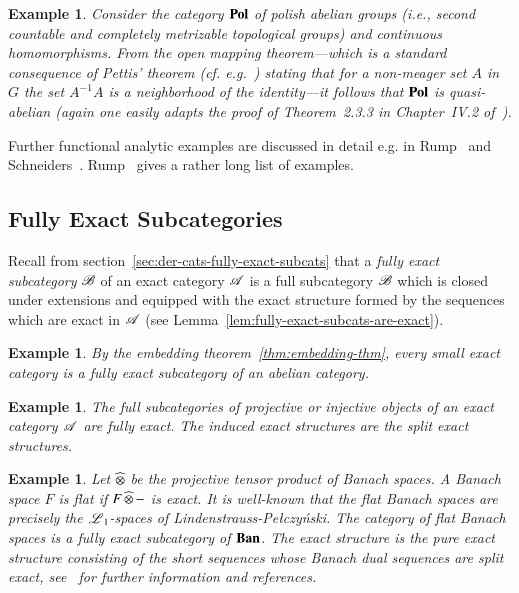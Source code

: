 \documentclass[1p]{elsarticle}
\theoremstyle{mythm}
\theoremstyle{mydef}
\newtheorem{Exm}[Thm]{Example}
\begin{document}
\begin{Exm}
  Consider the category $\operatorname{\mathbf{Pol}}$ of polish abelian groups (i.e., second
  countable and completely metrizable topological groups) and
  continuous homomorphisms. From the open mapping theorem---which is a
  standard consequence of Pettis' theorem (cf. 
  e.g.~\cite[(9.9), p.~61]{MR1321597}) 
  stating that for a non-meager set $A$ in $G$ the
  set $A^{-1}A$ is a neighborhood of the identity---it follows that
  $\operatorname{\mathbf{Pol}}$ is quasi-abelian (again one easily adapts the proof of
  Theorem~2.3.3 in Chapter~IV.2 of~\cite{mythesis}).
\end{Exm}

Further functional analytic examples are discussed in detail e.g. in
Rump~\cite{MR1749013} and
Schneiders~\cite{MR1779315}. Rump~\cite{rump-counterexample} gives a
rather long list of examples.%

\subsection{Fully Exact Subcategories}

Recall from section~\ref{sec:der-cats-fully-exact-subcats} that a
\emph{fully exact subcategory} $\operatorname{\mathscr{B}}$ of an exact category $\operatorname{\mathscr{A}}$ is a
full subcategory $\operatorname{\mathscr{B}}$ which is closed under extensions
and equipped with the exact structure formed by the sequences which
are exact in $\operatorname{\mathscr{A}}$ (see Lemma~\ref{lem:fully-exact-subcats-are-exact}).

\begin{Exm}
  By the embedding theorem~\ref{thm:embedding-thm},
  every small exact category is a fully
  exact subcategory of an abelian category.
\end{Exm}

\begin{Exm}
  The full subcategories of projective or injective objects of an
  exact category $\operatorname{\mathscr{A}}$ are fully exact. The induced exact structures
  are the split exact structures.
\end{Exm}

\begin{Exm}
  Let $\operatorname{\widehat{\otimes}}$ be the projective tensor product of Banach spaces. A
  Banach space $F$ is \emph{flat} if $F \operatorname{\widehat{\otimes}} {-}$ is exact. It is
  well-known that the flat Banach spaces are precisely the
  $\operatorname{\mathscr{L}}_{1}$-spaces of Lindenstrauss-Pe\l{}czy\'n{}ski.
  The category of flat Banach spaces is a fully exact subcategory of 
  $\operatorname{\mathbf{Ban}}$. The exact
  structure is the pure exact structure consisting of the
  short sequences whose Banach dual sequences are split exact, 
  see~\cite[Ch.~IV.2]{mythesis} for further information and references.
\end{Exm}
\end{document}

